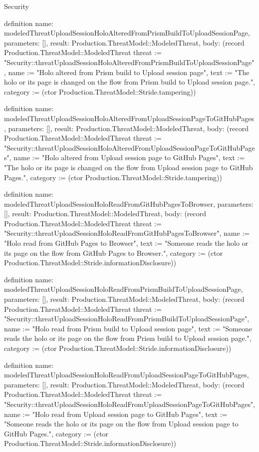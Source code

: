 \begin{lexlean}{Security}
\begin{semanticmodule}
definition{
  name: modeledThreatUploadSessionHoloAlteredFromPrismBuildToUploadSessionPage,
  parameters: [],
  result: Production.ThreatModel::ModeledThreat,
  body: (record Production.ThreatModel::ModeledThreat {threat := "Security::threatUploadSessionHoloAlteredFromPrismBuildToUploadSessionPage", name := "Holo altered from Prism build to Upload session page", text := "The holo or its page is changed on the flow from Prism build to Upload session page.", category := (ctor Production.ThreatModel::Stride.tampering)})
}

definition{
  name: modeledThreatUploadSessionHoloAlteredFromUploadSessionPageToGitHubPages,
  parameters: [],
  result: Production.ThreatModel::ModeledThreat,
  body: (record Production.ThreatModel::ModeledThreat {threat := "Security::threatUploadSessionHoloAlteredFromUploadSessionPageToGitHubPages", name := "Holo altered from Upload session page to GitHub Pages", text := "The holo or its page is changed on the flow from Upload session page to GitHub Pages.", category := (ctor Production.ThreatModel::Stride.tampering)})
}

definition{
  name: modeledThreatUploadSessionHoloReadFromGitHubPagesToBrowser,
  parameters: [],
  result: Production.ThreatModel::ModeledThreat,
  body: (record Production.ThreatModel::ModeledThreat {threat := "Security::threatUploadSessionHoloReadFromGitHubPagesToBrowser", name := "Holo read from GitHub Pages to Browser", text := "Someone reads the holo or its page on the flow from GitHub Pages to Browser.", category := (ctor Production.ThreatModel::Stride.informationDisclosure)})
}

definition{
  name: modeledThreatUploadSessionHoloReadFromPrismBuildToUploadSessionPage,
  parameters: [],
  result: Production.ThreatModel::ModeledThreat,
  body: (record Production.ThreatModel::ModeledThreat {threat := "Security::threatUploadSessionHoloReadFromPrismBuildToUploadSessionPage", name := "Holo read from Prism build to Upload session page", text := "Someone reads the holo or its page on the flow from Prism build to Upload session page.", category := (ctor Production.ThreatModel::Stride.informationDisclosure)})
}

definition{
  name: modeledThreatUploadSessionHoloReadFromUploadSessionPageToGitHubPages,
  parameters: [],
  result: Production.ThreatModel::ModeledThreat,
  body: (record Production.ThreatModel::ModeledThreat {threat := "Security::threatUploadSessionHoloReadFromUploadSessionPageToGitHubPages", name := "Holo read from Upload session page to GitHub Pages", text := "Someone reads the holo or its page on the flow from Upload session page to GitHub Pages.", category := (ctor Production.ThreatModel::Stride.informationDisclosure)})
}


\end{semanticmodule}
\end{lexlean}
